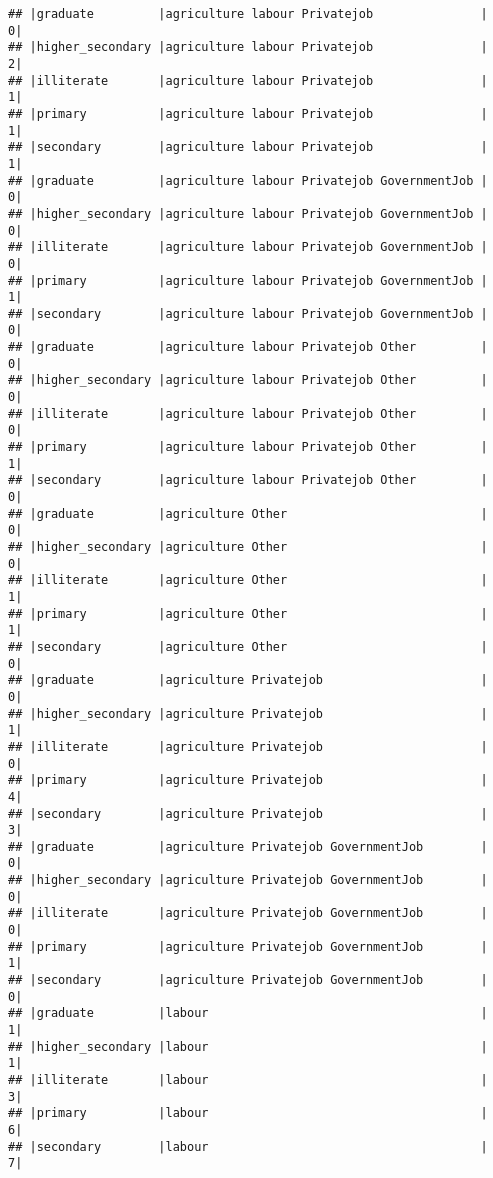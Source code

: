 \documentclass[
]{article}
\begin{document}
\begin{verbatim}
## |graduate         |agriculture labour Privatejob               |     0|
## |higher_secondary |agriculture labour Privatejob               |     2|
## |illiterate       |agriculture labour Privatejob               |     1|
## |primary          |agriculture labour Privatejob               |     1|
## |secondary        |agriculture labour Privatejob               |     1|
## |graduate         |agriculture labour Privatejob GovernmentJob |     0|
## |higher_secondary |agriculture labour Privatejob GovernmentJob |     0|
## |illiterate       |agriculture labour Privatejob GovernmentJob |     0|
## |primary          |agriculture labour Privatejob GovernmentJob |     1|
## |secondary        |agriculture labour Privatejob GovernmentJob |     0|
## |graduate         |agriculture labour Privatejob Other         |     0|
## |higher_secondary |agriculture labour Privatejob Other         |     0|
## |illiterate       |agriculture labour Privatejob Other         |     0|
## |primary          |agriculture labour Privatejob Other         |     1|
## |secondary        |agriculture labour Privatejob Other         |     0|
## |graduate         |agriculture Other                           |     0|
## |higher_secondary |agriculture Other                           |     0|
## |illiterate       |agriculture Other                           |     1|
## |primary          |agriculture Other                           |     1|
## |secondary        |agriculture Other                           |     0|
## |graduate         |agriculture Privatejob                      |     0|
## |higher_secondary |agriculture Privatejob                      |     1|
## |illiterate       |agriculture Privatejob                      |     0|
## |primary          |agriculture Privatejob                      |     4|
## |secondary        |agriculture Privatejob                      |     3|
## |graduate         |agriculture Privatejob GovernmentJob        |     0|
## |higher_secondary |agriculture Privatejob GovernmentJob        |     0|
## |illiterate       |agriculture Privatejob GovernmentJob        |     0|
## |primary          |agriculture Privatejob GovernmentJob        |     1|
## |secondary        |agriculture Privatejob GovernmentJob        |     0|
## |graduate         |labour                                      |     1|
## |higher_secondary |labour                                      |     1|
## |illiterate       |labour                                      |     3|
## |primary          |labour                                      |     6|
## |secondary        |labour                                      |     7|

\end{verbatim}
\end{document}

